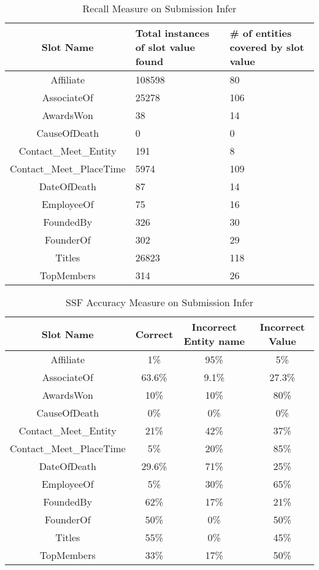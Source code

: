 \begin{table}
\caption{Recall Measure on Submission Infer }
\centering
\label{table:finalresultrecall}
\begin{tabular}{|c|p{3.5cm}|p{4cm}|}
\hline 
 \textbf{Slot Name} & \textbf{Total instances of slot value found} & \textbf{\# of entities covered by slot value} \\ 
\hline 
Affiliate & 108598 & 80 \\ \hline 
AssociateOf & 25278 & 106 \\ \hline 
AwardsWon & 38 & 14 \\ \hline 
CauseOfDeath & 0 & 0 \\ \hline 
Contact\_Meet\_Entity & 191 & 8 \\ \hline 
Contact\_Meet\_PlaceTime & 5974 & 109 \\ \hline 
DateOfDeath & 87 & 14 \\ \hline 
EmployeeOf & 75 & 16 \\ \hline 
FoundedBy & 326 & 30 \\ \hline 
FounderOf & 302 &  29 \\ \hline 
Titles & 26823 & 118 \\ \hline 
TopMembers & 314 & 26 \\ \hline 

\end{tabular} 
\end{table}







\begin{table}
\caption{SSF Accuracy Measure on Submission Infer }
\centering
\label{table:finalresultaccuracy}
\begin{tabular}{|c|c|c|c|}
\hline 
 \textbf{Slot Name}  & \textbf{Correct} & \textbf{Incorrect Entity name} & \textbf{Incorrect Value} \\ 
\hline 
Affiliate & 1\% & 95\% & 5\% \\ \hline 
AssociateOf & 63.6\% & 9.1\% & 27.3\%  \\ \hline 
AwardsWon & 10\% & 10\% & 80\%  \\ \hline 
CauseOfDeath & 0\% & 0\% & 0\%  \\ \hline 
Contact\_Meet\_Entity & 21\% & 42\% & 37\%  \\ \hline 
Contact\_Meet\_PlaceTime & 5\% & 20\% & 85\%  \\ \hline 
DateOfDeath & 29.6\% & 71\% & 25\%  \\ \hline 
EmployeeOf & 5\% & 30\% & 65\%  \\ \hline 
FoundedBy & 62\% & 17\% & 21\%  \\ \hline 
FounderOf & 50\% & 0\% & 50\%  \\ \hline 
Titles & 55\% & 0\% & 45\%  \\ \hline 
TopMembers & 33\% & 17\% & 50\%  \\ \hline 

\end{tabular} 
\end{table}









